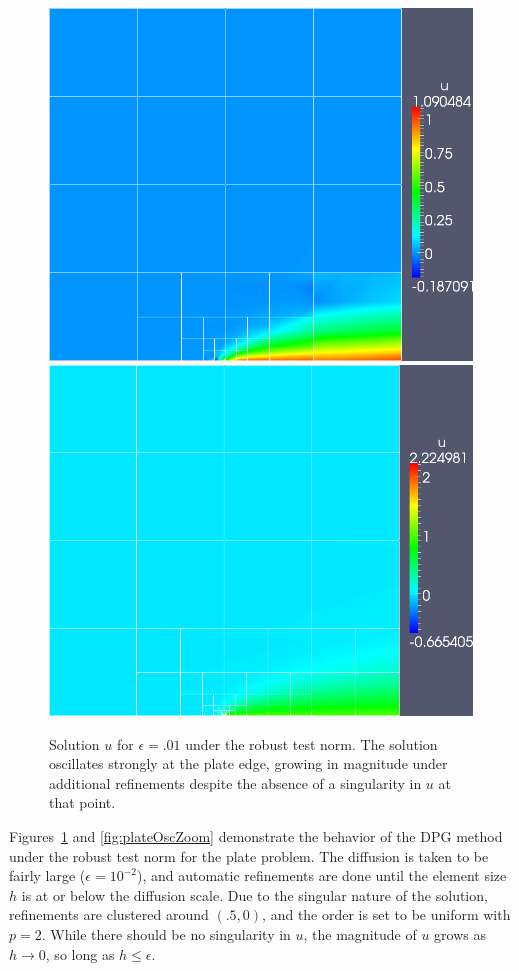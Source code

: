 \documentclass[letterpaper]{article}
\begin{document}
\begin{figure}[!h]
\centering
\includegraphics[scale=.275]{figs/LaplaceFigs/confusion1e2h1e2.png}
\includegraphics[scale=.275]{figs/LaplaceFigs/confusion1e2h1e3.png}
\caption{Solution $u$ for $\epsilon = .01$ under the robust test norm.  The solution oscillates strongly at the plate edge, growing in magnitude under additional refinements despite the absence of a singularity in $u$ at that point.}
\label{fig:plateOsc}
\end{figure}

Figures~\ref{fig:plateOsc} and \ref{fig:plateOscZoom} demonstrate the behavior
of the DPG method under the robust test norm for the plate problem.  The
diffusion is taken to be fairly large ($\epsilon = 10^{-2}$), and automatic
refinements are done until the element size $h$ is at or below the diffusion
scale.  Due to the singular nature of the solution, refinements are clustered
around $(.5,0)$, and the order is set to be uniform with $p=2$.  While there
should be no singularity in $u$, the magnitude of $u$ grows as $h \rightarrow
0$, so long as $h\leq \epsilon$.  
\end{document}
